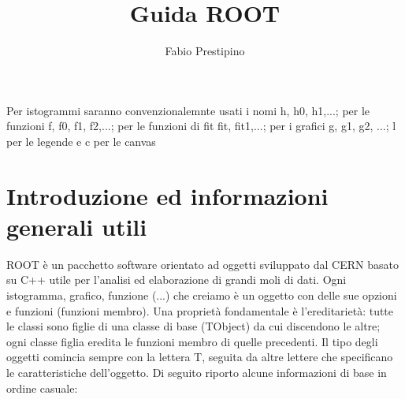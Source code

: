 \documentclass[10pt,a4paper]{article}
\author{Fabio Prestipino}
\title{Guida ROOT}
\begin{document}
	
	\maketitle
	\tableofcontents
	\newpage
Per istogrammi saranno convenzionalemnte usati i nomi h, h0, h1,...; per le funzioni f, f0, f1, f2,...; per le funzioni di fit fit, fit1,...; per i grafici g, g1, g2, ...; l per le legende e c per le canvas
\section{Introduzione ed informazioni generali utili}
ROOT è un pacchetto software orientato ad oggetti sviluppato dal CERN basato su C++ utile per l'analisi ed elaborazione di grandi moli di dati. Ogni istogramma, grafico, funzione (...) che creiamo è un oggetto con delle sue opzioni e funzioni (funzioni membro). Una proprietà fondamentale è l'ereditarietà: tutte le classi sono figlie di una classe di base (TObject) da cui discendono le altre; ogni classe figlia eredita le funzioni membro di quelle precedenti. Il tipo degli oggetti comincia sempre con la lettera T, seguita da altre lettere che specificano le caratteristiche dell'oggetto. Di seguito riporto alcune informazioni di base in ordine casuale:
\end{document}
